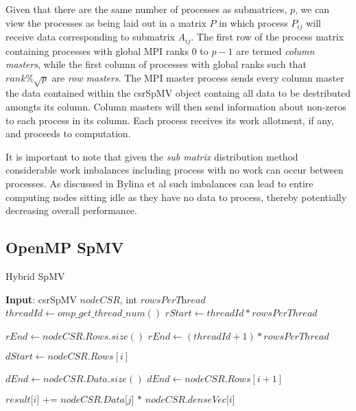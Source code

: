 Given that there are the same number of processes as submatrices, $p$, we can view the processes as being laid out in a matrix $P$ in which process $P_{ij}$ will receive data corresponding to submatrix $A_{ij}$.
The first row of the process matrix containing processes with global MPI ranks $0$ to $p-1$ are termed \emph{column masters}, while the first column of processes with global ranks such that $rank \% \sqrt{p} $ are \emph{row masters}.
The MPI master process sends every column master the data contained within the csrSpMV object containg all data to be destributed amongts its column.
Column masters will then send information about non-zeros to each process in its column.
Each process receives its work allotment, if any, and proceeds to computation.

It is important to note that given the \emph{sub matrix} distribution method considerable work imbalances including process with no work can occur between processes. As discussed in Bylina et al such imbalances can lead to entire computing nodes sitting idle as they have no data to process, thereby potentially decreasing overall performance. 

\subsection{OpenMP SpMV}

\begin{algorithm}
\caption{Hybrid SpMV}\label{spmv}
\begin{algorithmic}[1]
	\State \textbf{Input}: csrSpMV $\textit{nodeCSR}$, int $\textit{rowsPerThread}$
	\medskip
	\State $threadId \gets omp\_get\_thread\_num()$
	\State $rStart \gets threadId*rowsPerThread$
	\medskip
	
		\State $rEnd \gets nodeCSR.Rows.size()$
	\Else 
		\State $rEnd \gets (threadId+1) * rowsPerThread$
	\EndIf
	\medskip
	
		\State $dStart \gets nodeCSR.Rows[i]$
		
			\State $dEnd \gets nodeCSR.Data.size()$
		\Else 
			\State $dEnd \gets nodeCSR.Rows[i+1]$
		\EndIf
			
			\State $\textit{result[i] += nodeCSR.Data[j] * nodeCSR.denseVec[i]}$
		\EndFor
	\EndFor
	
	\EndProcedure
\end{algorithmic}
\end{algorithm}

